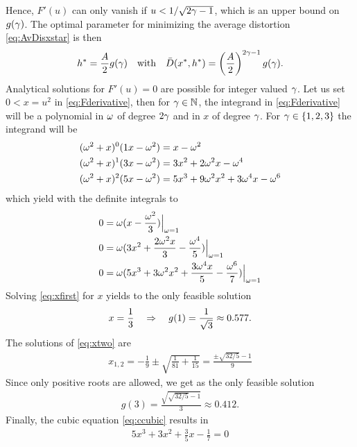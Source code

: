 \documentclass[12pt,onecolumn,final,letterpaper]{IEEEtran}
\newcommand{\Dis}{\ensuremath{D}}                    %
\newcommand{\AvDis}{\ensuremath{\bar{\Dis}}}         %
\begin{document}
  Hence, $F'(u)$ can only vanish if $u<1/\sqrt{2\gamma-1}$, which is an upper bound on $g(\gamma)$.
  The optimal parameter for minimizing the average distortion  \eqref{eq:AvDisxstar} is then 
  \begin{align}
    h^*= \frac{A}{2} g(\gam) \quad\text{with}\quad \AvDis(x^*,h^*)= \left(\frac{A}{2}\right)^{2\gam-1} g(\gam).
  \end{align}
  Analytical solutions for $F'(u)=0$ are possible for integer valued $\gamma$.  Let us set $0<x=u^2$ in
  \eqref{eq:Fderivative}, then for $\gamma\in{\ensuremath{\mathbb N}}$, the integrand in \eqref{eq:Fderivative} will be a polynomial in $\omega$
  of degree $2\gamma$ and in $x$ of degree $\gamma$. For $\gamma\in\{1,2,3\}$ the integrand will be 
%
\begin{align}
  (\omega^2+x)^0 (1x-\omega^2)&=x-\omega^2\\
  (\omega^2+x)^1 (3x-\omega^2)&=3x^2+2\omega^2x -\omega^4 \\
  (\omega^2+x)^2 (5x-\omega^2)&=5x^3 +9\omega^2 x^2 +3\omega^4 x -\omega^6
\end{align}
%
which yield with the definite integrals to
%
\begin{align}
  0 &= \omega(x-\frac{\omega^2}{3})\Big|_{\omega=1}\label{eq:xfirst}\\
  0 &= \omega( 3x^2 +\frac{2\omega^2x}{3} -\frac{\omega^4}{5}  )\Big|_{\omega=1}\label{eq:xtwo}\\ 
  0 &= \omega( 5x^3 + 3\omega^2x^2 +\frac{3\omega^4x}{5}  -\frac{\omega^6}{7}  )\Big|_{\omega=1}\label{eq:ccubic} 
\end{align}
%
Solving \eqref{eq:xfirst} for $x$  yields to the only feasible solution
%
\begin{align}
  x=\frac{1}{3} \quad\Rightarrow\quad g(1)=\frac{1}{\sqrt{3}}\approx 0.577.
\end{align}
%
The solutions of \eqref{eq:xtwo} are 
%
\begin{align}
  x_{1,2}= -\frac{1}{9} \pm \sqrt{\frac{1}{81}+\frac{1}{15}} = \frac{\pm \sqrt{32/5} -1}{9}
\end{align}
%
Since only positive roots are allowed, we get as the only feasible solution
%
\begin{align}
  g(3)=\frac{\sqrt{\sqrt{32/5}-1}}{3}\approx 0.412.
\end{align}
%
Finally, the cubic equation \eqref{eq:ccubic} results in
%
\begin{align}
  5x^3 + 3 x^2 + \frac{3}{5} x - \frac{1}{7}=0
\end{align}
\end{document}
